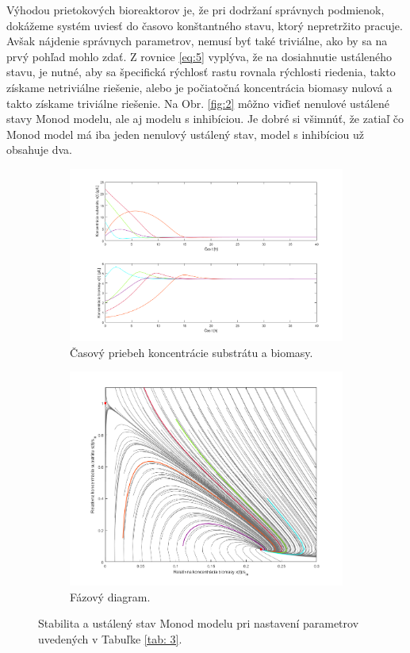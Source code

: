 Výhodou prietokových bioreaktorov je, že pri dodržaní správnych podmienok, dokážeme systém uviesť do časovo konštantného stavu, ktorý nepretržito pracuje. Avšak nájdenie správnych parametrov, nemusí byť také triviálne, ako by sa na prvý pohľad mohlo zdať. Z rovnice \ref{eq:5}
vyplýva, že na dosiahnutie ustáleného stavu, je nutné, aby sa špecifická rýchlosť rastu rovnala rýchlosti riedenia, takto získame netriviálne riešenie, alebo je počiatočná koncentrácia biomasy nulová a takto získame triviálne riešenie. Na Obr. \ref{fig:2} môžno viďieť nenulové ustálené stavy Monod modelu, ale aj modelu s inhibíciou. Je dobré si všimnúť, že zatiaľ čo Monod model má iba jeden nenulový ustálený stav, model s inhibíciou už obsahuje dva.

\begin{figure}
	\begin{subfigure}{.5\textwidth}
		\centering
		\includegraphics[width=1\linewidth]{images/init_cond_Monod}
		\caption[]{Časový priebeh koncentrácie substrátu a biomasy.}
	\end{subfigure}
	\begin{subfigure}{.5\textwidth}
		\centering
		\includegraphics[width=1\linewidth]{images/phase_Monod}
		\caption[]{Fázový diagram.}
	\end{subfigure}
	\caption{Stabilita a ustálený stav Monod modelu pri nastavení parametrov uvedených v Tabuľke \ref{tab: 3}.}
	\label{fig:4}
\end{figure}

